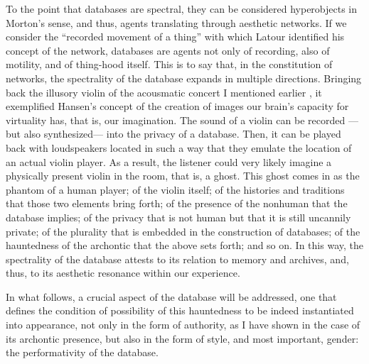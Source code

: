 To the point that databases are spectral, they can be considered hyperobjects in Morton's sense, and thus, agents translating through aesthetic networks. If we consider the ``recorded movement of a thing'' with which Latour identified his concept of the network, databases are agents not only of recording, also of motility, and of thing-hood itself. This is to say that, in the constitution of networks, the spectrality of the database expands in multiple directions. Bringing back the illusory violin of the acousmatic concert I mentioned earlier , it exemplified Hansen's concept of the creation of images our brain's capacity for virtuality has, that is, our imagination. The sound of a violin can be recorded ---but also synthesized--- into the privacy of a database. Then, it can be played back with loudspeakers located in such a way that they emulate the location of an actual violin player. As a result, the listener could very likely imagine a physically present violin in the room, that is, a ghost. This ghost comes in as the phantom of a human player; of the violin itself; of the histories and traditions that those two elements bring forth; of the presence of the nonhuman that the database implies; of the privacy that is not human but that it is still uncannily private; of the plurality that is embedded in the construction of databases; of the hauntedness of the archontic that the above sets forth; and so on. In this way, the spectrality of the database attests to its relation to memory and archives, and, thus, to its aesthetic resonance within our experience.

In what follows, a crucial aspect of the database will be addressed, one that defines the condition of possibility of this hauntedness to be indeed instantiated into appearance, not only in the form of authority, as I have shown in the case of its archontic presence, but also in the form of style, and most important, gender: the performativity of the database.
